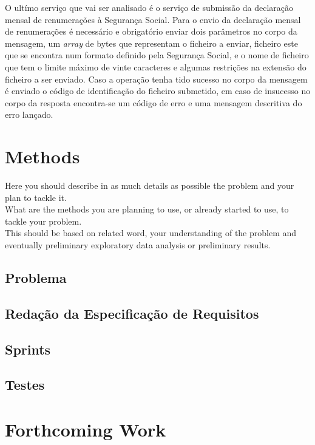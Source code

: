 \documentclass[sigplan]{acmart}
\begin{document}
O ultímo serviço que vai ser analisado é o serviço de submissão da declaração mensal de renumerações à Segurança Social. Para o envio da declaração mensal de renumerações é necessário e obrigatório enviar dois parâmetros no corpo da mensagem, um \textit{array} de bytes que representam o ficheiro a enviar, ficheiro este que se encontra num formato definido pela Segurança Social, e o nome de ficheiro que tem o limite máximo de vinte caracteres e algumas restrições na extensão do ficheiro a ser enviado. Caso a operação tenha tido sucesso no corpo da mensagem é enviado o código de identificação do ficheiro submetido, em caso de insucesso no corpo da resposta encontra-se um código de erro e uma mensagem descritiva do erro lançado.

\section{Methods} \label{sec:methods}

Here you should describe in as much details as possible the problem and your plan to tackle it. \\

What are the methods you are planning to use, or already started to use, to tackle your problem. \\

This should be based on related word, your understanding of the problem and eventually preliminary exploratory data analysis or preliminary results.

\subsection{Problema} %

\subsection{Redação da Especificação de Requisitos}

\subsection{Sprints}

\subsection{Testes}

\section{Forthcoming Work} \label{sec:forthcomingwork}
\end{document}
